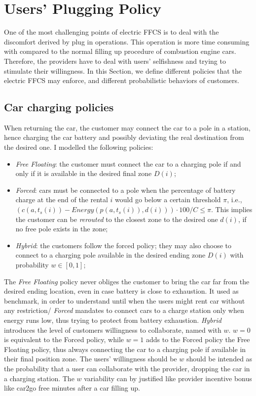 \section{Users' Plugging Policy}

One of the most challenging points of electric FFCS is to deal with the discomfort derived by plug in operations. This operation is more time consuming with compared to the normal filling up procedure of combustion engine cars. Therefore, the providers have to deal with users' selfishness and trying to stimulate their willingness.  
In this Section, we define different policies that the electric FFCS may enforce, and different probabilistic behaviors of customers. 

\subsection{Car charging policies}
When returning the car, the customer may connect the car to a pole in a station, hence charging the car battery and possibly deviating the real destination from the desired one. I modelled the following policies:
\begin{itemize}
	\item{\it Free Floating}: the customer must connect the car to a charging pole if and only if it is available in the desired final zone $D(i)$;
	\item{\it Forced}: cars must be connected to a pole when the percentage of battery charge at the end of the rental $i$ would go below a certain threshold $\pi$, i.e., $(c(a,t_{s}(i)) - Energy(p(a,t_{s}(i)), d(i))) \cdot 100/ C\leq  \pi $. This implies the customer can be \textit{rerouted} to the closest zone to the desired one $d(i)$, if no free pole exists in the zone; %
	\item{\it Hybrid}: the customers follow the forced policy; they may  also choose to connect to a charging pole available in the desired ending zone $D(i)$ with probability $w\in [0,1]$;
\end{itemize}

The \textit{Free Floating} policy never obliges the customer to bring the car far from the desired ending location, even in case battery is close to exhaustion. It used as benchmark, in order to understand until when the users might rent car without any restriction/
\textit{Forced} mandates to connect cars to a charge station only when energy runs low, thus trying to protect from battery exhaustion.
\textit{Hybrid} introduces the level of customers willingness to collaborate, named with $w$. $w=0$ is equivalent to the Forced policy, while $w=1$ adds to the Forced policy the Free Floating policy,  thus always connecting the car to a charging pole if available in their final position zone. The users' willingness should be $w$ should be intended as the probability that a user can collaborate with the provider, dropping the car in a charging station. The $w$ variability can by justified like provider incentive bonus like car2go free minutes after a car filling up.

